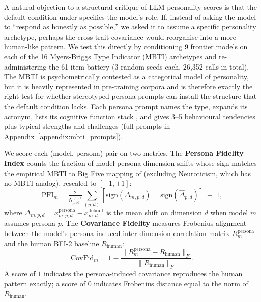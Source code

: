 \documentclass[11pt]{article}
\begin{document}
A natural objection to a structural critique of LLM personality scores is that the default condition under-specifies the model's role.
If, instead of asking the model to ``respond as honestly as possible,'' we asked it to assume a specific personality archetype, perhaps the cross-trait covariance would reorganise into a more human-like pattern.
We test this directly by conditioning 9 frontier models on each of the 16 Myers-Briggs Type Indicator (MBTI) archetypes and re-administering the 61-item battery (3 random seeds each, 26{,}352 calls in total).
The MBTI is psychometrically contested as a categorical model of personality, but it is heavily represented in pre-training corpora and is therefore exactly the right test for whether stereotyped persona prompts can install the structure that the default condition lacks.
Each persona prompt names the type, expands its acronym, lists its cognitive function stack \citep{jiang2023personality}, and gives 3--5 behavioural tendencies plus typical strengths and challenges (full prompts in Appendix~\ref{appendix:mbti_prompts}).

We score each (model, persona) pair on two metrics.
The \textbf{Persona Fidelity Index} counts the fraction of model-persona-dimension shifts whose sign matches the empirical MBTI to Big Five mapping of \citet{mccrae1992five} (excluding Neuroticism, which has no MBTI analog), rescaled to $[-1, +1]$:
\[
\mathrm{PFI}_m = \tfrac{2}{N^{(m)}_{\mathrm{pred}}} \!\!\sum_{(p, d)} \!\![\mathrm{sign}(\Delta_{m,p,d}) = \mathrm{sign}(\widehat{\Delta}_{p,d})] \;-\; 1,
\]
where $\Delta_{m,p,d} = \overline{x}^{\mathrm{persona}}_{m,p,d} - \overline{x}^{\mathrm{default}}_{m,d}$ is the mean shift on dimension $d$ when model $m$ assumes persona $p$.
The \textbf{Covariance Fidelity} measures Frobenius alignment between the model's persona-induced inter-dimension correlation matrix $R^{\mathrm{persona}}_m$ and the human BFI-2 baseline $R_{\mathrm{human}}$:
\[
\mathrm{CovFid}_m = 1 - \frac{\| R^{\mathrm{persona}}_m - R_{\mathrm{human}} \|_F}{\| R_{\mathrm{human}} \|_F}.
\]
A score of $1$ indicates the persona-induced covariance reproduces the human pattern exactly; a score of $0$ indicates Frobenius distance equal to the norm of $R_{\mathrm{human}}$.

\end{document}
